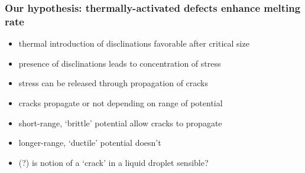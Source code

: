 \documentclass[11pt]{article}
\begin{document}
\subsubsection{Our hypothesis:  thermally-activated defects enhance melting rate}
\label{sec-3-1-3}
\begin{itemize}

\item thermal introduction of disclinations favorable after critical size\\
\label{sec-3-1-3-1}%
\item presence of disclinations leads to concentration of stress\\
\label{sec-3-1-3-2}%
\item stress can be released through propagation of cracks\\
\label{sec-3-1-3-3}%
\item cracks propagate or not depending on range of potential\\
\label{sec-3-1-3-4}%
\item short-range, `brittle' potential allow cracks to propagate\\
\label{sec-3-1-3-5}%
\item longer-range, `ductile' potential doesn't\\
\label{sec-3-1-3-6}%
\item (?) is notion of a `crack' in a liquid droplet sensible?\\
\label{sec-3-1-3-7}%
\end{itemize} %
\end{document}
